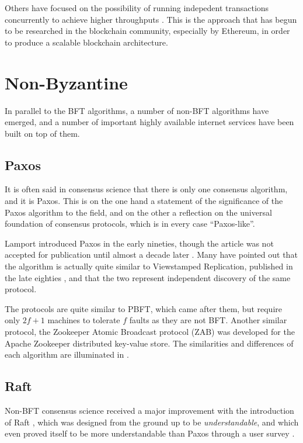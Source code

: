 Others have focused on the possibility of running indepedent transactions concurrently to achieve higher throughputs \cite{kotla2004high}.
This is the approach that has begun to be researched in the blockchain community, especially by Ethereum, in order to produce a scalable blockchain architecture.

\section{Non-Byzantine}

In parallel to the BFT algorithms, a number of non-BFT algorithms have emerged, and a 
number of important highly available internet services have been built on top of them.

\subsection{Paxos}

It is often said in consensus science that there is only one consensus algorithm, and it is Paxos.
This is on the one hand a statement of the significance of the Paxos algorithm to the field,
and on the other a reflection on the universal foundation of consensus protocols,
which is in every case ``Paxos-like''.

Lamport introduced Paxos in the early nineties, though the article was not accepted for publication until 
almost a decade later \cite{paxos}.
Many have pointed out that the algorithm is actually quite similar to Viewstamped Replication,
published in the late eighties \cite{oki1988viewstamped},
and that the two represent independent discovery of the same protocol.

The protocols are quite similar to PBFT, which came after them, 
but require only $2f+1$ machines to tolerate $f$ faults as they are not BFT.
Another similar protocol, the Zookeeper Atomic Broadcast protocol (ZAB) \cite{junqueira2011zab}
was developed for the Apache Zookeeper distributed key-value store.
The similarities and differences of each algorithm are illuminated in \cite{van2015vive}.

\subsection{Raft} 

Non-BFT consensus science received a major improvement with the introduction of Raft \cite{raft},
which was designed from the ground up to be \emph{understandable}, 
and which even proved itself to be more understandable than Paxos through a user survey \cite{raft_thesis}.

